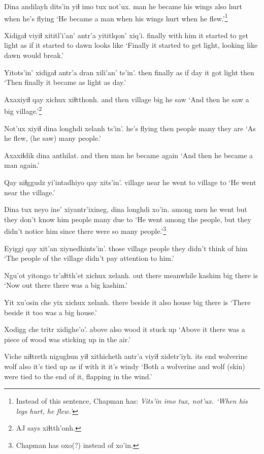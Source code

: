 \documentclass[12pt]{article}
\begin{document}
\gll Dina andilayh dits'in  yiɬ imo tux not'ux.
man {he became} {his wings} also hurt when {he's flying}
\glt `He became a man when his wings hurt when he flew.'\footnote{Instead of this sentence, Chapman has: \em Vits'in imo tux, not'ux. \em `When his legs hurt, he flew.'}
\glend

\gll Xidigaɬ viyiɬ xititl'i'an'  antr'a yititlqon'   xiq'i.
finally {with him} {it started to get light} {as if} {it started to dawn} {looks like}
\glt `Finally it started to get light, looking like dawn would break.'
\glend

\gll Yitots'in' xidigaɬ antr'a dran xili'an'  ts'in'.
then finally {as if} day {it got light} then
\glt `Then finally it became as light as day.'
\glend

\gll Axaxiyiɬ qay  xichux xiɬtthonh.
{and then} village  big {he saw}
\glt `And then he saw a big village.'\footnote{AJ says xiɬtth'onh.}
\glend

\gll Not'ux  xiyiɬ dina longhdi xelanh ts'in'.
{he's flying} then people many  {they are}
\glt `As he flew, (he saw) many people.'
\glend

\gll Axaxiɬdik dina anthilat.
{and then} man {he became again}
\glt `And then he became a man again.'
\glend

\gll Qay  niɬggudz yi'intadhiyo qay  xits'in'.
village  near  {he went to} village  to
\glt `He went near the village.'
\glend

\gll Dina tux neyo  ine' xiyantr'ixineg, dina longhdi xo'in.
among men {he went} but {they don't know him} people many {due to}
\glt `He went among the people, but they didn't notice him since there were so many people.'\footnote{Chapman has oxo(?) instead of xo'in.}
\glend

\gll Eyiggi qay xit'an  xiynedhints'in'.
those village people {they didn't think of him}
\glt `The people of the village didn't pay attention to him.'
\glend

\gll Ngu'ot  yitongo tr'aɬtth'et xichux xelanh.
{out there} meanwhile kashim  big {there is}
\glt `Now out there there was a big kashim.'
\glend

\gll Yit xu'osin che yix xichux xelanh.
there {beside it} also house big {there is}
\glt `There beside it too was a big house.'
\glend

\gll Xodigg che tritr xidighe'o'.
above  also wood {it stuck up}
\glt `Above it there was a piece of wood was sticking up in the air.'
\glend

\gll Viche  niɬtreth  nigughun yiɬ xithicheth antr'a viyiɬ xidetr'iyh.
{its end} wolverine wolf also {it's tied up} {as if} {with it} {it's windy}
\glt `Both a wolverine and wolf (skin) were tied to the end of it, flapping in the wind.'
\glend
\end{document}

